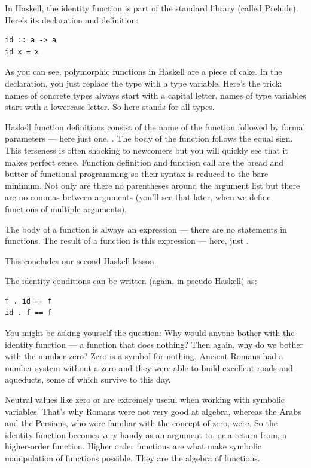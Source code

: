 In Haskell, the identity function is part of the standard library
(called Prelude). Here's its declaration and definition:

\begin{Verbatim}[commandchars=\\\{\}]
id :: a -> a
id x = x
\end{Verbatim}
As you can see, polymorphic functions in Haskell are a piece of cake. In
the declaration, you just replace the type with a type variable. Here's
the trick: names of concrete types always start with a capital letter,
names of type variables start with a lowercase letter. So here
 stands for all types.

Haskell function definitions consist of the name of the function
followed by formal parameters --- here just one, . The body of
the function follows the equal sign. This terseness is often shocking to
newcomers but you will quickly see that it makes perfect sense. Function
definition and function call are the bread and butter of functional
programming so their syntax is reduced to the bare minimum. Not only are
there no parentheses around the argument list but there are no commas
between arguments (you'll see that later, when we define functions of
multiple arguments).

The body of a function is always an expression --- there are no
statements in functions. The result of a function is this expression ---
here, just .

This concludes our second Haskell lesson.

The identity conditions can be written (again, in pseudo-Haskell) as:

\begin{Verbatim}[commandchars=\\\{\}]
f . id == f
id . f == f
\end{Verbatim}
You might be asking yourself the question: Why would anyone bother with
the identity function --- a function that does nothing? Then again, why
do we bother with the number zero? Zero is a symbol for nothing. Ancient
Romans had a number system without a zero and they were able to build
excellent roads and aqueducts, some of which survive to this day.

Neutral values like zero or  are extremely useful when
working with symbolic variables. That's why Romans were not very good at
algebra, whereas the Arabs and the Persians, who were familiar with the
concept of zero, were. So the identity function becomes very handy as an
argument to, or a return from, a higher-order function. Higher order
functions are what make symbolic manipulation of functions possible.
They are the algebra of functions.

